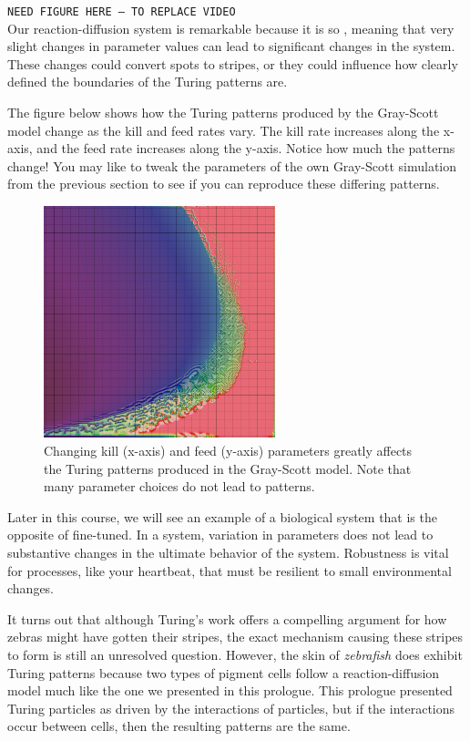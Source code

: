 {{\texttt{NEED FIGURE HERE -- TO REPLACE VIDEO}\\

Our reaction-diffusion system is remarkable because it is so , meaning that very slight changes in parameter values can lead to significant changes in the system. These changes could convert spots to stripes, or they could influence how clearly defined the boundaries of the Turing patterns are.

The figure below shows how the Turing patterns produced by the Gray-Scott model change as the kill and feed rates vary. The kill rate increases along the x-axis, and the feed rate increases along the y-axis. Notice how much the patterns change! You may like to tweak the parameters of the own Gray-Scott simulation from the previous section to see if you can reproduce these differing patterns.

\begin{figure}[h]
\centering
\mySfFamily
\includegraphics[width = 0.6\textwidth]{../images/xmorphia-parameter-map.jpg}
\caption{Changing kill (x-axis) and feed (y-axis) parameters greatly affects the Turing patterns produced in the Gray-Scott model. Note that many parameter choices do not lead to patterns.}
\label{fig:xmorphia-parameter-map}
\end{figure}

Later in this course, we will see an example of a biological system that is the opposite of fine-tuned. In a  system, variation in parameters does not lead to substantive changes in the ultimate behavior of the system. Robustness is vital for processes, like your heartbeat, that must be resilient to small environmental changes.

It turns out that although Turing's work offers a compelling argument for how zebras might have gotten their stripes, the exact mechanism causing these stripes to form is still an unresolved question. However, the skin of \textit{zebrafish} does exhibit Turing patterns because two types of pigment cells follow a reaction-diffusion model much like the one we presented in this prologue. This prologue presented Turing particles as driven by the interactions of particles, but if the interactions occur between cells, then the resulting patterns are the same.

}}
